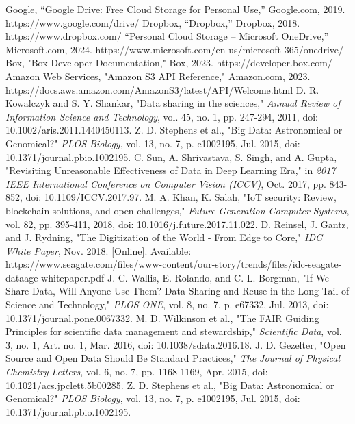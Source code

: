 \documentclass[conference]{IEEEtran}
\begin{document}
\begin{thebibliography}{00}
 Google, “Google Drive: Free Cloud Storage for Personal Use,” Google.com, 2019. https://www.google.com/drive/
 Dropbox, “Dropbox,” Dropbox, 2018. https://www.dropbox.com/
 “Personal Cloud Storage – Microsoft OneDrive,” Microsoft.com, 2024. https://www.microsoft.com/en-us/microsoft-365/onedrive/
 Box, "Box Developer Documentation," Box, 2023. https://developer.box.com/
 Amazon Web Services, "Amazon S3 API Reference," Amazon.com, 2023. https://docs.aws.amazon.com/AmazonS3/latest/API/Welcome.html
 D. R. Kowalczyk and S. Y. Shankar, "Data sharing in the sciences," \textit{Annual Review of Information Science and Technology}, vol. 45, no. 1, pp. 247-294, 2011, doi: 10.1002/aris.2011.1440450113.
 Z. D. Stephens et al., "Big Data: Astronomical or Genomical?" \textit{PLOS Biology}, vol. 13, no. 7, p. e1002195, Jul. 2015, doi: 10.1371/journal.pbio.1002195.
 C. Sun, A. Shrivastava, S. Singh, and A. Gupta, "Revisiting Unreasonable Effectiveness of Data in Deep Learning Era," in \textit{2017 IEEE International Conference on Computer Vision (ICCV)}, Oct. 2017, pp. 843-852, doi: 10.1109/ICCV.2017.97.
 M. A. Khan, K. Salah, "IoT security: Review, blockchain solutions, and open challenges," \textit{Future Generation Computer Systems}, vol. 82, pp. 395-411, 2018, doi: 10.1016/j.future.2017.11.022.
 D. Reinsel, J. Gantz, and J. Rydning, "The Digitization of the World - From Edge to Core," \textit{IDC White Paper}, Nov. 2018. [Online]. Available: https://www.seagate.com/files/www-content/our-story/trends/files/idc-seagate-dataage-whitepaper.pdf
 J. C. Wallis, E. Rolando, and C. L. Borgman, "If We Share Data, Will Anyone Use Them? Data Sharing and Reuse in the Long Tail of Science and Technology," \textit{PLOS ONE}, vol. 8, no. 7, p. e67332, Jul. 2013, doi: 10.1371/journal.pone.0067332.
 M. D. Wilkinson et al., "The FAIR Guiding Principles for scientific data management and stewardship," \textit{Scientific Data}, vol. 3, no. 1, Art. no. 1, Mar. 2016, doi: 10.1038/sdata.2016.18.
 J. D. Gezelter, "Open Source and Open Data Should Be Standard Practices," \textit{The Journal of Physical Chemistry Letters}, vol. 6, no. 7, pp. 1168-1169, Apr. 2015, doi: 10.1021/acs.jpclett.5b00285.
 Z. D. Stephens et al., "Big Data: Astronomical or Genomical?" \textit{PLOS Biology}, vol. 13, no. 7, p. e1002195, Jul. 2015, doi: 10.1371/journal.pbio.1002195.

\end{thebibliography}
\end{document}
